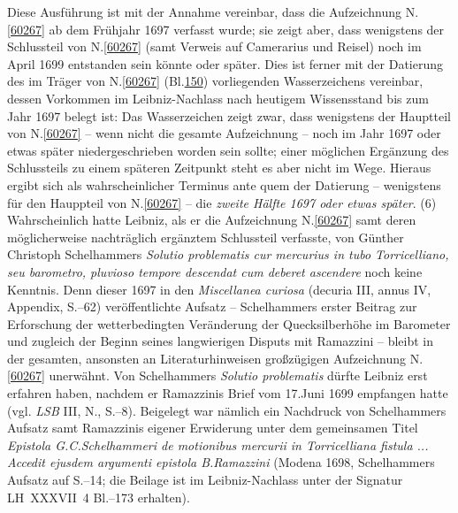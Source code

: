 Diese Ausführung %
ist mit der Annahme vereinbar, dass die Aufzeichnung N.\;\ref{60267} ab dem Frühjahr 1697 verfasst wurde;
sie zeigt aber, dass wenigstens der Schlussteil von N.\;\ref{60267} (samt Verweis auf Camerarius und Reisel) noch im April 1699 entstanden sein könnte oder später.
Dies ist ferner mit der Datierung des im Träger von N.\;\ref{60267} (Bl.\;\href{\Scan{LH_37_04_150wz}}{150}) vorliegenden Wasserzeichens vereinbar, dessen Vorkommen im Leibniz-Nachlass nach heutigem Wissensstand bis zum Jahr 1697 belegt ist:
Das Wasserzeichen zeigt zwar, dass wenigstens der Hauptteil von N.\;\ref{60267} -- wenn nicht die gesamte Aufzeichnung -- noch im Jahr 1697 oder etwas später niedergeschrieben worden sein sollte;
einer möglichen Ergänzung des Schlussteils zu einem späteren Zeitpunkt steht es aber nicht im Wege.
Hieraus ergibt sich als wahrscheinlicher Terminus ante quem der Datierung -- wenigstens für den Hauppteil von N.\;\ref{60267} -- die \textit{zweite Hälfte 1697 oder etwas später}.
\pend%
\pstart%
%
(6)
Wahrscheinlich hatte Leibniz, als er die Aufzeichnung N.\;\ref{60267} samt deren möglicherweise nachträglich ergänztem Schlussteil verfasste, von Günther Christoph Schelhammers \textit{Solutio problematis cur mercurius in tubo Torricelliano, seu barometro, pluvioso tempore descendat cum deberet ascendere} noch keine Kenntnis.\cite{01450}
Denn dieser 1697 in den \textit{Miscellanea curiosa} (decuria III, annus IV, Appendix, S.--62)\cite{01459} veröffentlichte Aufsatz -- Schelhammers erster Beitrag zur Erforschung der wetterbedingten Veränderung der Quecksilberhöhe im Barometer und zugleich der Beginn seines langwierigen Disputs mit Ramazzini -- bleibt in der gesamten, ansonsten an Literaturhinweisen großzügigen Aufzeichnung N.\;\ref{60267} unerwähnt.
Von Schelhammers \textit{Solutio problematis}\cite{01450} dürfte Leibniz erst erfahren haben, nachdem er Ramazzinis Brief vom 17.\;Juni 1699 empfangen hatte (vgl. \textit{LSB} III, N., S.--8\cite{01448}).
Beigelegt war nämlich ein Nachdruck von Schelhammers Aufsatz samt Ramazzinis eigener Erwiderung unter dem gemeinsamen Titel \textit{Epistola G.\:C.\:Schelhammeri de motionibus mercurii in Torricelliana fistula ... Accedit ejusdem argumenti epistola B.\:Ramazzini} (Modena 1698,\cite{01451} Schelhammers Aufsatz auf S.--14;\cite{01450} die Beilage ist im Leibniz-Nachlass unter der Signatur LH~XXXVII~4 Bl.--173 erhalten).
